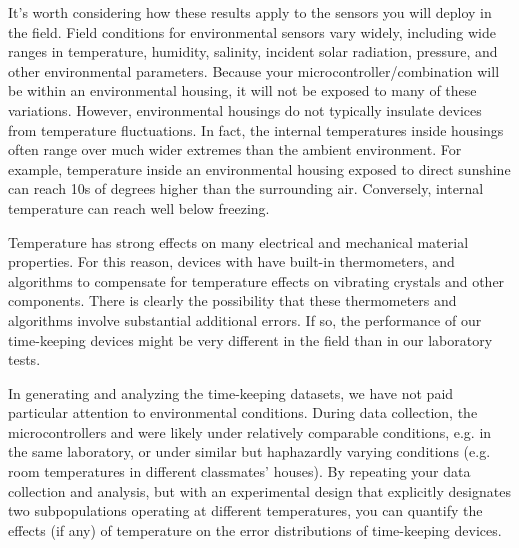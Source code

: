 It's worth considering how these results apply to the sensors you will deploy in the field. 
Field conditions for environmental sensors vary widely, including wide ranges in temperature, humidity, salinity, incident solar radiation, pressure, and other environmental parameters. 
Because your microcontroller/\rtc combination will be within an environmental housing, it will not be exposed to many of these variations. 
However, environmental housings do not typically insulate devices from temperature fluctuations.
In fact, the internal temperatures inside housings often range over much wider extremes than the ambient environment.
For example, temperature inside an environmental housing exposed to direct sunshine can reach 10s of degrees higher than the surrounding air. 
Conversely, internal temperature can reach well below freezing.

Temperature has strong effects on many electrical and mechanical material properties. 
For this reason, devices with \rtcs have built-in thermometers, and algorithms to compensate for temperature effects on vibrating crystals and other components.
There is clearly the possibility that these thermometers and algorithms involve substantial additional errors.
If so, the performance of our time-keeping devices might be very different in the field than in our laboratory tests.

In generating and analyzing the time-keeping datasets, we have not paid particular attention to environmental conditions. 
During data collection, the microcontrollers and \rtcs were likely under relatively comparable conditions, e.g. in the same laboratory, or under similar but haphazardly varying conditions (e.g. room temperatures in different classmates' houses).
By repeating your data collection and analysis, but with an experimental design that explicitly designates two subpopulations operating at different temperatures, you can quantify the effects (if any) of temperature on the error distributions of time-keeping devices.

